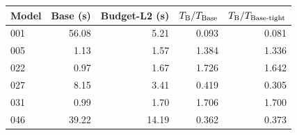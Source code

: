 \begin{tabular}{lrrrr}
\toprule
Model & Base (s) & Budget-L2 (s) & $T_{\rm B}/T_{\rm Base}$ & $T_{\rm B}/T_{\rm Base\text{-}tight}$\\
\midrule
001 & 56.08 & 5.21 & 0.093 & 0.081\\
005 & 1.13 & 1.57 & 1.384 & 1.336\\
022 & 0.97 & 1.67 & 1.726 & 1.642\\
027 & 8.15 & 3.41 & 0.419 & 0.305\\
031 & 0.99 & 1.70 & 1.706 & 1.700\\
046 & 39.22 & 14.19 & 0.362 & 0.373\\
\bottomrule
\end{tabular}
